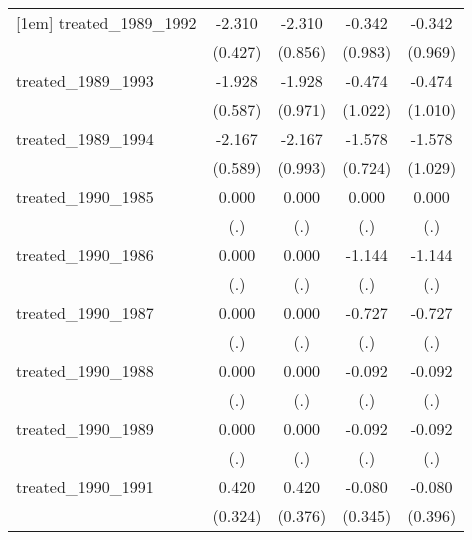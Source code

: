 {\begin{tabular}{l*{4}{c}}
[1em]
treated\_1989\_1992&      -2.310\sym{***}&      -2.310\sym{**} &      -0.342         &      -0.342         \\
            &     (0.427)         &     (0.856)         &     (0.983)         &     (0.969)         \\
[1em]
treated\_1989\_1993&      -1.928\sym{**} &      -1.928\sym{*}  &      -0.474         &      -0.474         \\
            &     (0.587)         &     (0.971)         &     (1.022)         &     (1.010)         \\
[1em]
treated\_1989\_1994&      -2.167\sym{***}&      -2.167\sym{*}  &      -1.578\sym{*}  &      -1.578         \\
            &     (0.589)         &     (0.993)         &     (0.724)         &     (1.029)         \\
[1em]
treated\_1990\_1985&       0.000         &       0.000         &       0.000         &       0.000         \\
            &         (.)         &         (.)         &         (.)         &         (.)         \\
[1em]
treated\_1990\_1986&       0.000         &       0.000         &      -1.144         &      -1.144         \\
            &         (.)         &         (.)         &         (.)         &         (.)         \\
[1em]
treated\_1990\_1987&       0.000         &       0.000         &      -0.727         &      -0.727         \\
            &         (.)         &         (.)         &         (.)         &         (.)         \\
[1em]
treated\_1990\_1988&       0.000         &       0.000         &      -0.092         &      -0.092         \\
            &         (.)         &         (.)         &         (.)         &         (.)         \\
[1em]
treated\_1990\_1989&       0.000         &       0.000         &      -0.092         &      -0.092         \\
            &         (.)         &         (.)         &         (.)         &         (.)         \\
[1em]
treated\_1990\_1991&       0.420         &       0.420         &      -0.080         &      -0.080         \\
            &     (0.324)         &     (0.376)         &     (0.345)         &     (0.396)         \\

\end{tabular}}
